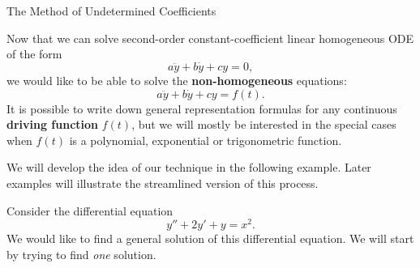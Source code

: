 \documentclass[12pt,letterpaper,twoside]{amsart}
\newcounter{example}
\newcounter{exercise}
\newcommand{\example}{\bigskip \noindent {\large {\sc Example \arabic{example}:}} \addtocounter{example}{1}}
\begin{document}
\sffamily

\begin{center} {\LARGE The Method of Undetermined Coefficients} \end{center}

\setcounter{example}{1}
\setcounter{exercise}{1}


Now that we can solve second-order constant-coefficient linear homogeneous ODE of the form 
\[ a\ddot{y}+b\dot{y}+cy=0,\]
we would like to be able to solve the {\bf non-homogeneous} equations:
\[ a\ddot{y}+b\dot{y}+cy=f(t).\]
It is possible to write down general representation formulas for any continuous {\bf driving function} $f(t)$, but we will mostly be interested in the special cases when $f(t)$ is a polynomial, exponential or trigonometric function.

We will develop the idea of our technique in the following example.  Later examples will illustrate the streamlined version of this process.

\example Consider the differential equation 
\[y''+2y'+y=x^2.\]
We would like to find a general solution of this differential equation.  We will start by trying to find {\it one} solution.
\end{document}
